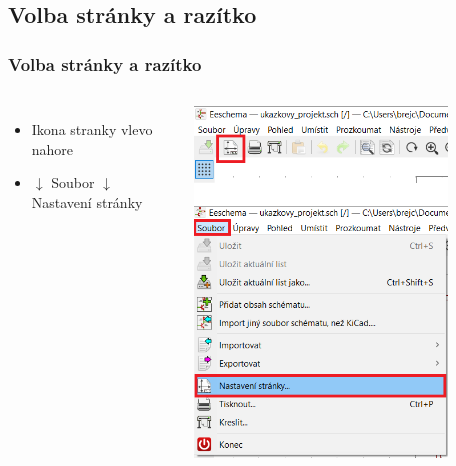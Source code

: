 \documentclass{beamer}
\begin{document}
\subsection{\texorpdfstring{Volba stránky a razítko}{Volba stranky a razitko}}
\begin{frame}
	\frametitle{Volba stránky a razítko}
	\begin{columns}
	
		\small
		\begin{itemize}
			\item Ikona stranky vlevo nahore
			\item $\downarrow$ Soubor $\downarrow$ Nastavení stránky
		\end{itemize}
		
		\begin{center}
			\includegraphics[width=0.8\textwidth]{obr/razitko01.png}
		\end{center}
		
	\end{columns}
\end{frame}
\end{document}
